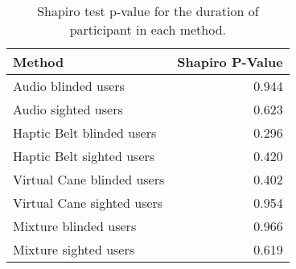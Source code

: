 
\begin{table}[!htb]
\centering
\caption{Shapiro test p-value for the duration of participant in each method.}
\label{tab:shapiro_duration}
\begin{tabular}{lr}
\toprule
                    Method &  Shapiro P-Value \\
\midrule
       Audio blinded users &            0.944 \\
       Audio sighted users &            0.623 \\
 Haptic Belt blinded users &            0.296 \\
 Haptic Belt sighted users &            0.420 \\
Virtual Cane blinded users &            0.402 \\
Virtual Cane sighted users &            0.954 \\
     Mixture blinded users &            0.966 \\
     Mixture sighted users &            0.619 \\
\bottomrule
\end{tabular}
\end{table}

